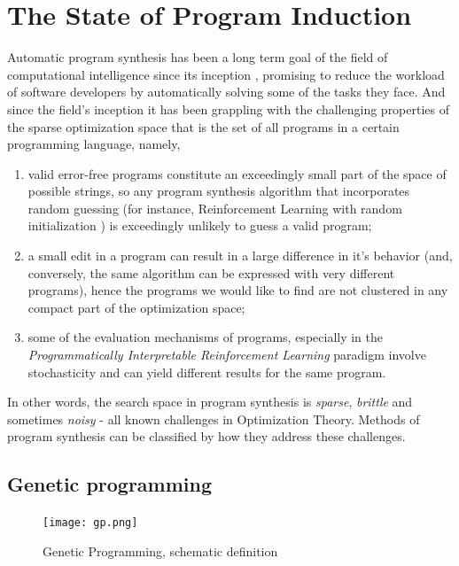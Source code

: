 \chapter{The State of Program Induction}
\label{ch:ps-methods}

Automatic program synthesis has been a long term goal of the field of computational intelligence since its inception \cite{mannaAutomaticProgramSynthesis1971}, promising to reduce the workload of software developers by automatically solving some of the tasks they face.
And since the field's inception it has been grappling with the challenging properties of the sparse optimization space \cite{alurSyntaxguidedSynthesis2013, davidProgramSynthesisChallenges2017} that is the set of all programs in a certain programming language, namely, 
\begin{enumerate}
    \item valid error-free programs constitute an exceedingly small part of the space of possible strings, so any program synthesis algorithm that incorporates random guessing (for instance, Reinforcement Learning with random initialization \cite{suttonReinforcementLearningSecond2018}) is exceedingly unlikely to guess a valid program;
    \item a small edit in a program can result in a large difference in it's behavior (and, conversely, the same algorithm can be expressed with very different programs), hence the programs we would like to find are not clustered in any compact part of the optimization space;
    \item some of the evaluation mechanisms of programs, especially in the \emph{Programmatically Interpretable Reinforcement Learning} paradigm involve stochasticity and can yield different results for the same program.
\end{enumerate}

In other words, the search space in program synthesis is \emph{sparse}, \emph{brittle} and sometimes \emph{noisy} \cite{arnoldNoisyOptimizationEvolution2002} - all known challenges in Optimization Theory.
Methods of program synthesis can be classified by how they address these challenges.

\newpage
\section{Genetic programming}
\label{sec:gp}

\begin{figure}
    \centering
    \texttt{[image: gp.png]}
    \caption{Genetic Programming, schematic definition}
    \label{fig:gp}
\end{figure}

